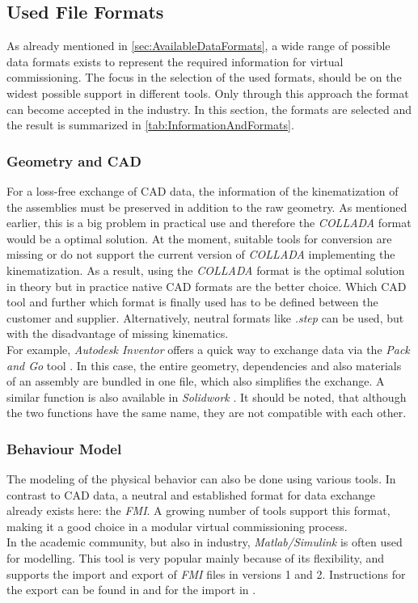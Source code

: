 \subsection{Used File Formats}
	As already mentioned in \autoref{sec:AvailableDataFormats}, a wide range of possible data formats exists to represent the required information for virtual commissioning. The focus in the selection of the used formats, should be on the widest possible support in different tools. Only through this approach the format can become accepted in the industry. In this section, the formats are selected and the result is summarized in \autoref{tab:InformationAndFormats}. \\

\subsubsection{Geometry and CAD}
	For a loss-free exchange of CAD data, the information of the kinematization of the assemblies must be preserved in addition to the raw geometry. As mentioned earlier, this is a big problem in practical use and therefore the \textit{COLLADA} format would be a optimal solution. At the moment, suitable tools for conversion are missing or do not support the current version of \textit{COLLADA} implementing the kinematization. As a result, using the \textit{COLLADA} format is the optimal solution in theory but in practice native CAD formats are the better choice. Which CAD tool and further which format is finally used has to be defined between the customer and supplier. Alternatively, neutral formats like \textit{.step} can be used, but with the disadvantage of missing kinematics. \\
	For example, \textit{Autodesk Inventor} offers a quick way to exchange data via the \textit{Pack and Go} tool \cite{InventorPackAndGo}. In this case, the entire geometry, dependencies and also materials of an assembly are bundled in one file, which also simplifies the exchange. A similar function is also available in \textit{Solidwork} \cite{SolidworksPackAndGo}. It should be noted, that although the two functions have the same name, they are not compatible with each other. \\

\subsubsection{Behaviour Model}
	The modeling of the physical behavior can also be done using various tools. In contrast to CAD data, a neutral and established format for data exchange already exists here: the \textit{FMI}. A growing number of tools support this format, making it a good choice in a modular virtual commissioning process. \\
	In the academic community, but also in industry, \textit{Matlab/Simulink} is often used for modelling. This tool is very popular mainly because of its flexibility, and supports the import and export of \textit{FMI} files in versions 1 and 2. Instructions for the export can be found in \cite{MatlabFmuExport} and for the import in \cite{MatlabFmuImport}. \\

